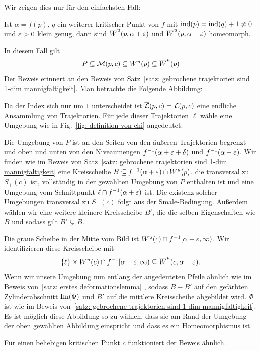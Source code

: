 \begin{bigproof}
   Wir zeigen dies nur für den einfachsten Fall:

    \begin{claim}
        Ist $\alpha = f(p)$, $q$ ein weiterer kritischer Punkt von $f$ mit 
        ${ \operatorname{ind} } (p) = { \operatorname{ind} } (q) + 1 \neq 0$ und $\varepsilon > 0$ klein genug, dann sind 
        ${ \overline{W}^u } (p, \alpha + \varepsilon)$ und ${ \overline{W}^u } (p, \alpha - \varepsilon)$ homeomorph.
    \end{claim}

    \begin{smallproof}
        In diesem Fall gilt 
        \[ P \subseteq \mathcal{M} (p, c) \subseteq { W^u } (p) \subseteq { \overline{W}^u } (p) \]
        Der Beweis erinnert an den Beweis von Satz~\ref{satz: gebrochene trajektorien sind 1-dim mannigfaltigkeit}.
        Man betrachte die Folgende Abbildung:

        Da der Index sich nur um $1$ unterscheidet ist ${\overline{\mathcal{L}} } (p, c) = { \mathcal{L} } (p, c)$ eine endliche Ansammlung 
        von Trajektorien. Für jede dieser Trajektorien $\ell$ wähle eine Umgebung wie in 
        Fig.~\ref{fig: definition von chi} angedeutet:

        Die Umgebung von $P$ ist an den Seiten von den äußeren Trajektorien begrenzt und oben und unten von den
        Niveaumengen $f^{-1}(\alpha + \varepsilon + \delta)$ und $f^{-1}(\alpha - \varepsilon)$. Wir finden wie im Beweis 
        von Satz~\ref{satz: gebrochene trajektorien sind 1-dim mannigfaltigkeit} eine Kreisscheibe 
        $B \subseteq f^{-1}(\alpha + \varepsilon) \cap { W^u } (p)$, die transversal zu $S_+(c)$ ist, vollständig in der 
        gewählten Umgebung von $P$ enthalten ist und eine Umgebung vom Schnittpunkt 
        $\ell \cap f^{-1}(\alpha + \varepsilon)$ ist. Die existenz solcher Umgebungen transversal zu $S_+(c)$ folgt 
        aus der Smale-Bedingung. Außerdem wählen wir eine weitere kleinere Kreisscheibe $B'$, 
        die die selben Eigenschaften wie $B$ und sodass gilt $B' \subsetneq B$. 

        Die graue Scheibe in der Mitte vom Bild ist ${ W^u } (c) \cap f^{-1} [\alpha - \varepsilon, \infty)$. 
        Wir identifizieren diese Kreisscheibe mit 
        \[ \{ \ell \} \times { W^u } (c) \cap f^{-1} [\alpha - \varepsilon, \infty) \subseteq 
            { \overline{W}^u } (c, \alpha - \varepsilon) . \]
        Wenn wir unsere Umgebung nun entlang der angedeuteten Pfeile ähnlich wie im Beweis 
        von~\ref{satz: erstes deformationslemma} , sodass 
        $B - B'$ auf den gefärbten Zylinderabschnitt ${ \operatorname{Im} } (\Phi)$ und $B'$ auf die mittlere Kreisscheibe 
        abgebildet wird. $\Phi$ ist wie im Beweis 
        von~\ref{satz: gebrochene trajektorien sind 1-dim mannigfaltigkeit}. 
        Es ist möglich diese Abbildung so zu wählen, dass sie am Rand der Umgebung der 
        oben gewählten Abbildung einspricht und dass es ein Homeomorphismus ist.
    \end{smallproof}

    Für einen beliebigen kritischen Punkt $c$ funktioniert der Beweis ähnlich.
\end{bigproof}

